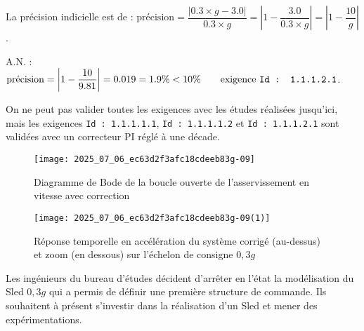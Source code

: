 \ifprof
\begin{corrige}
La précision indicielle est de :
$ \text{précision} = \dfrac{|0.3\times g - 3.0|}{0.3 \times g} = \left|1 - \dfrac{3.0}{0.3 \times g} \right| = \left|1 - \dfrac{10}{g}\right|$.

A.N. : $ \text{précision} = \left|1 -\dfrac{10}{9.81}\right| = 0.019 = 1.9\% < 10\% \qquad \text{exigence \texttt{Id : 1.1.1.2.1}}$.

On ne peut pas valider toutes les exigences avec les études réalisées jusqu'ici, mais les exigences \texttt{Id : 1.1.1.1.1}, \texttt{Id : 1.1.1.1.2} et \texttt{Id : 1.1.1.2.1} sont validées avec un correcteur PI réglé à une décade.
\end{corrige}
\else
\fi


\ifprof
\else
\begin{figure}[!h]
\centering
\texttt{[image: 2025\_07\_06\_ec63d2f3afc18cdeeb83g-09]}

\caption{\label{ccs_mp_2022_fig_11}Diagramme de Bode de la boucle ouverte de l'asservissement en vitesse avec correction}
\end{figure}

\begin{figure}[!h]
\centering
\texttt{[image: 2025\_07\_06\_ec63d2f3afc18cdeeb83g-09(1)]}

\caption{\label{ccs_mp_2022_fig_12}Réponse temporelle en accélération du système corrigé (au-dessus) et zoom (en dessous) sur l'échelon de consigne $0,3 g$}
\end{figure}

Les ingénieurs du bureau d'études décident d'arrêter en l'état la modélisation du Sled $0,3 g$ qui a permis de définir une première structure de commande. Ils souhaitent à présent s'investir dans la réalisation d'un Sled et mener des expérimentations.
\fi
